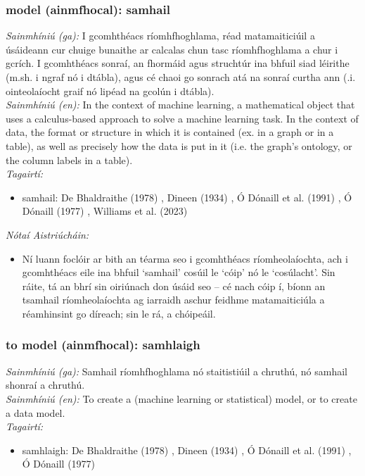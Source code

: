 \subsubsection*{model (ainmfhocal): samhail}
 \noindent \textit{Sainmhíniú (ga):} I gcomhthéacs ríomhfhoghlama, réad matamaiticiúil a úsáideann cur chuige bunaithe ar calcalas chun tasc ríomhfhoghlama a chur i gcrích. I gcomhthéacs sonraí, an fhormáid agus struchtúr ina bhfuil siad léirithe (m.sh. i ngraf nó i dtábla), agus cé chaoi go sonrach atá na sonraí curtha ann (.i. ointeolaíocht graif nó lipéad na gcolún i dtábla).
\\
 \noindent \textit{Sainmhíniú (en):} In the context of machine learning, a mathematical object that uses a calculus-based approach to solve a machine learning task. In the context of data, the format or structure in which it is contained (ex. in a graph or in a table), as well as precisely how the data is put in it (i.e. the graph's ontology, or the column labels in a table).
\\
 \noindent \textit{Tagairtí:}
\begin{itemize}
	\item samhail: De Bhaldraithe (1978) \cite{de-bhaldraithe}, Dineen (1934) \cite{dineen}, Ó Dónaill et al. (1991) \cite{focloir-beag}, Ó Dónaill (1977) \cite{odonaill}, Williams et al. (2023) \cite{storchiste}
\end{itemize}

 \noindent \textit{Nótaí Aistriúcháin:}
\begin{itemize}
	\item Ní luann foclóir ar bith an téarma seo i gcomhthéacs ríomheolaíochta, ach i gcomhthéacs eile ina bhfuil `samhail' cosúil le `cóip' nó le `cosúlacht'. Sin ráite, tá an bhrí sin oiriúnach don úsáid seo -- cé nach cóip í, bíonn an tsamhail ríomheolaíochta ag iarraidh aschur feidhme matamaiticiúla a réamhinsint go díreach; sin le rá, a chóipeáil.
\end{itemize}


\subsubsection*{to model (ainmfhocal): samhlaigh}
 \noindent \textit{Sainmhíniú (ga):} Samhail ríomhfhoghlama nó staitistiúil a chruthú, nó samhail shonraí a chruthú.
\\
 \noindent \textit{Sainmhíniú (en):} To create a (machine learning or statistical) model, or to create a data model.
\\
 \noindent \textit{Tagairtí:}
\begin{itemize}
	\item samhlaigh: De Bhaldraithe (1978) \cite{de-bhaldraithe}, Dineen (1934) \cite{dineen}, Ó Dónaill et al. (1991) \cite{focloir-beag}, Ó Dónaill (1977) \cite{odonaill}
\end{itemize}

